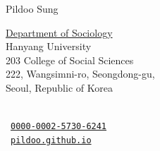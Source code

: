 \documentclass[letterpaper,10pt]{article}
\newcommand{\tffldr}{sections/}
\begin{document}
\setlength{\leftskip}{\mg}

{\huge Pildoo Sung}
\vspace{0.5em}

\begin{minipage}[t]{0.55\textwidth}
    \begin{flushleft}
        \href{https://socio.hanyang.ac.kr/home}{Department of Sociology} \\
        Hanyang University \\
        203 College of Social Sciences \\
        222, Wangsimni-ro, Seongdong-gu, \\
        Seoul, Republic of Korea
    \end{flushleft}
\end{minipage}
\hfill
\begin{minipage}[t]{0.40\textwidth}
    \begin{flushleft}
        \textcolor{itemcat}{\faEnvelope[regular]}~\texttt{\href{mailto:\email}{\email}} \\
        \textcolor{itemcat}{}~\texttt{\href{https://orcid.org/0000-0002-5730-6241}{0000-0002-5730-6241}} \\
        \textcolor{itemcat}{\faHome[regular]}~\texttt{\href{https://pildoo.github.io}{pildoo.github.io}}
    \end{flushleft}
\end{minipage}











\end{document}
